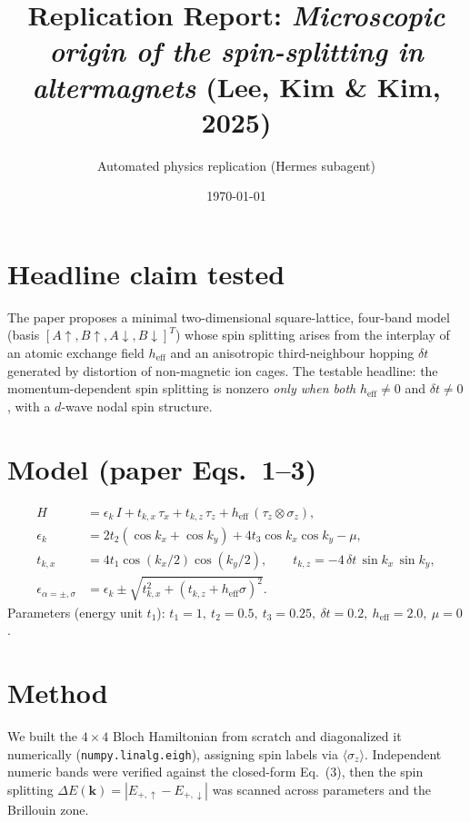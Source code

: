 \documentclass[11pt]{article}
\title{Replication Report: \emph{Microscopic origin of the spin-splitting in altermagnets} (Lee, Kim \& Kim, 2025)}
\author{Automated physics replication (Hermes subagent)}
\date{\today}
\begin{document}
\maketitle

\section{Headline claim tested}
The paper proposes a minimal two-dimensional square-lattice, four-band model
(basis $[A\!\uparrow,B\!\uparrow,A\!\downarrow,B\!\downarrow]^T$) whose spin
splitting arises from the interplay of an atomic exchange field $h_{\text{eff}}$
and an anisotropic third-neighbour hopping $\delta t$ generated by distortion of
non-magnetic ion cages. The testable headline: the momentum-dependent spin
splitting is nonzero \emph{only when both} $h_{\text{eff}}\neq0$ and
$\delta t\neq0$, with a $d$-wave nodal spin structure.

\section{Model (paper Eqs.\ 1--3)}
\begin{align}
H &= \epsilon_k\, I + t_{k,x}\,\tau_x + t_{k,z}\,\tau_z + h_{\text{eff}}\,(\tau_z\otimes\sigma_z),\\
\epsilon_k &= 2t_2(\cos k_x+\cos k_y) + 4t_3\cos k_x\cos k_y - \mu,\\
t_{k,x} &= 4t_1\cos(k_x/2)\cos(k_y/2),\qquad
t_{k,z} = -4\,\delta t\,\sin k_x\,\sin k_y,\\
\epsilon_{\alpha=\pm,\sigma} &= \epsilon_k \pm \sqrt{t_{k,x}^2 + (t_{k,z}+h_{\text{eff}}\sigma)^2}.
\end{align}
Parameters (energy unit $t_1$): $t_1{=}1,\ t_2{=}0.5,\ t_3{=}0.25,\ \delta t{=}0.2,\ h_{\text{eff}}{=}2.0,\ \mu{=}0$.

\section{Method}
We built the $4\times4$ Bloch Hamiltonian from scratch and diagonalized it
numerically (\texttt{numpy.linalg.eigh}), assigning spin labels via
$\langle\sigma_z\rangle$. Independent numeric bands were verified against the
closed-form Eq.~(3), then the spin splitting
$\Delta E(\mathbf{k})=|E_{+,\uparrow}-E_{+,\downarrow}|$ was scanned across
parameters and the Brillouin zone.
\end{document}
